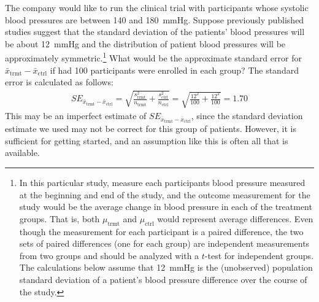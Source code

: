 \begin{example}{The company would like to run the clinical trial with participants whose systolic blood pressures are between 140 and 180~mmHg. Suppose previously published studies suggest that the standard deviation of the patients' blood pressures will be about 12~mmHg and the distribution of patient blood pressures will be approximately symmetric.\footnote{In this particular study, measure each participants blood pressure measured at the beginning and end of the study, and the outcome measurement for the study would be the average change in blood pressure in each of the treatment groups. That is, both $\mu_{ \text{trmt}}$ and $\mu_{ \text{ctrl}}$ would represent average differences. Even though the measurement for each participant is a paired difference, the two sets of paired differences (one for each group) are independent measurements from two groups and should be analyzed with a $t$-test for independent groups. The calculations below assume that 12~mmHg is the (unobserved) population standard deviation of a patient's blood pressure difference over the course of the study.} What would be the approximate standard error for $\bar{x}_{ \text{trmt}} - \bar{x}_{ \text{ctrl}}$ if had 100 participants were enrolled in each group?}
The standard error is calculated as follows:
\begin{align*}
SE_{\bar{x}_{ \text{trmt}} - \bar{x}_{ \text{ctrl}}}
  = \sqrt{\frac{s_{ \text{trmt}}^2}{n_{ \text{trmt}}} + \frac{s_{ \text{ctrl}}^2}{n_{ \text{ctrl}}}}
  = \sqrt{\frac{12^2}{100} + \frac{12^2}{100}}
  = 1.70
\end{align*}
This may be an imperfect estimate of $SE_{\bar{x}_{ \text{trmt}} - \bar{x}_{ \text{ctrl}}}$, since the standard deviation estimate we used may not be correct for this group of patients. However, it is sufficient for getting started, and an assumption like this is often all that is available.
\end{example}






